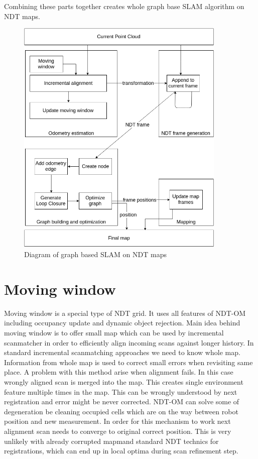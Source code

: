 Combining these parts together creates whole graph base \gls{SLAM} algorithm on NDT maps.   

\begin{figure}
	\centering
	\includegraphics[width=100mm]{../img/algorithm_runtime.png}
	\caption{Diagram of graph based SLAM on NDT maps}
	\label{fig:algorithm}
\end{figure}
  
\newpage


\section{Moving window}
\label{sec:window}
Moving window is a special type of \gls{NDT} grid. It uses all features of \gls{NDT-OM} including occupancy update and dynamic object rejection. Main idea behind moving window is to offer small map which can be used by incremental scanmatcher in order to efficiently align incoming scans against longer history. In standard incremental scanmatching approaches we need to know whole map. Information from whole map is used to correct small errors  when revisiting same place. A problem with this method arise when alignment fails. In this case wrongly aligned scan is merged into the map. This creates single environment feature multiple times in the map. This can be wrongly understood by next registration and error might be never corrected. \gls{NDT-OM} can solve some of degeneration be cleaning occupied cells which are on the way between robot position and new measurement. In order for this mechanism to work next alignment scan needs to converge to original correct position. This is very unlikely with already corrupted mapmand standard NDT technics for registrations, which can end up in local optima during scan refinement step.

